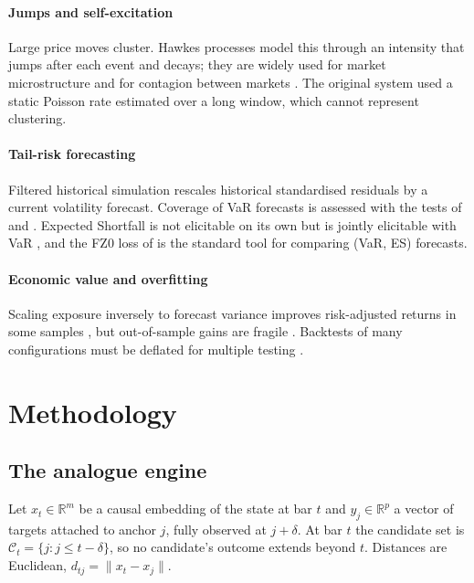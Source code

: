 \documentclass[preprint,12pt,authoryear]{elsarticle}
\begin{document}
\paragraph{Jumps and self-excitation} Large price moves cluster. Hawkes processes
\citep{hawkes1971} model this through an intensity that jumps after each event and decays; they
are widely used for market microstructure \citep{bacry2015} and for contagion between markets
\citep{aitsahalia2015}. The original system used a static Poisson rate estimated over a long
window, which cannot represent clustering.

\paragraph{Tail-risk forecasting} Filtered historical simulation \citep{baroneadesi1999} rescales
historical standardised residuals by a current volatility forecast. Coverage of VaR forecasts is
assessed with the tests of \citet{kupiec1995} and \citet{christoffersen1998}. Expected Shortfall is
not elicitable on its own but is jointly elicitable with VaR \citep{fissler2016}, and the FZ0 loss
of \citet{patton2019} is the standard tool for comparing (VaR, ES) forecasts.

\paragraph{Economic value and overfitting} Scaling exposure inversely to forecast variance
improves risk-adjusted returns in some samples \citep{moreira2017}, but out-of-sample gains are
fragile \citep{cederburg2020}. Backtests of many configurations must be deflated for multiple
testing \citep{bailey2012,bailey2014,harvey2016}.

\section{Methodology}
\label{sec:method}

\subsection{The analogue engine}
Let $x_t\in\mathbb{R}^m$ be a causal embedding of the state at bar $t$ and $y_j\in\mathbb{R}^p$ a
vector of targets attached to anchor $j$, fully observed at $j+\delta$. At bar $t$ the candidate
set is $\mathcal{C}_t=\{j: j\le t-\delta\}$, so no candidate's outcome extends beyond $t$.
Distances are Euclidean, $d_{tj}=\lVert x_t-x_j\rVert$.
\end{document}
